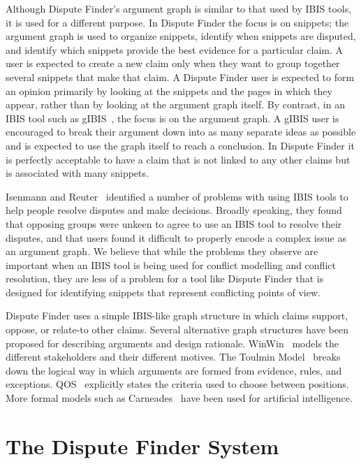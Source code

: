 \documentclass{www2010-submission}
\begin{document}
Although Dispute Finder's argument graph is similar to that used by IBIS tools, it is used for a different purpose. 
In Dispute Finder the focus is on snippets; the argument graph is used to organize snippets, identify when snippets are disputed, and identify which snippets provide the best evidence for a particular claim. 
A user is expected to create a new claim only when they want to group together several snippets that make that claim. 
A Dispute Finder user is expected to form an opinion primarily by looking at the snippets and the pages in which they appear, rather than by looking at the argument graph itself. By contrast, in an IBIS tool such as gIBIS~\cite{Conklin1987a}, the focus is on the argument graph. A gIBIS user is encouraged to break their argument down into as many separate ideas as possible and is expected to use the graph itself to reach a conclusion. In Dispute Finder it is perfectly acceptable to have a claim that is not linked to any other claims but is associated with many snippets.

Isenmann and Reuter~\cite{Isenmann1997} identified a number of problems with using IBIS tools to help people resolve disputes and make decisions. Broadly speaking, they found that opposing groups were unkeen to agree to use an IBIS tool to resolve their disputes, and that users found it difficult to properly encode a complex issue as an argument graph. We believe that while the problems they observe are important when an IBIS tool is being used for conflict modelling and conflict resolution, they are less of a problem for a tool like Dispute Finder that is designed for identifying snippets that represent conflicting points of view.

Dispute Finder uses a simple IBIS-like graph structure in which claims support, oppose, or relate-to other claims. Several alternative graph structures have been proposed for describing arguments and design rationale. WinWin~\cite{Boehm2006} models the different stakeholders and their different motives. The Toulmin Model~\cite{toulmin1958} breaks down the logical way in which arguments are formed from evidence, rules, and exceptions. QOS~\cite{Maclean1991} explicitly states the criteria used to choose between positions. More formal models such as Carneades~\cite{Gordon2007} have been used for artificial intelligence.


\section{The Dispute Finder System}
\end{document}
